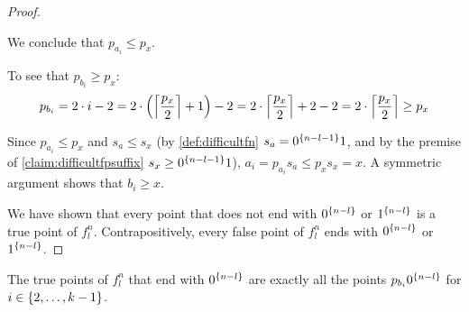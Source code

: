 \begin{proof}
\begin{itemize}
We conclude that $p_{a_i} \leq p_x$.

To see that $p_{b_i} \geq p_x$:
$$
p_{b_i}
= 2 \cdot i - 2
= 2 \cdot \round*{\ceil*{\frac{p_x}{2}} + 1} - 2
= 2 \cdot \ceil*{\frac{p_x}{2}} + 2 - 2
= 2 \cdot \ceil*{\frac{p_x}{2}}
\geq p_x
$$

Since $p_{a_i} \leq p_x$ and $s_a \leq s_x$
(by \cref{def:difficultfn}
$s_a = \rep{0}{n-l-1} 1$,
and by the premise of \cref{claim:difficultfpsuffix}
$s_x \geq \rep{0}{n-l-1} 1$),
$a_i = p_{a_i} s_a \leq p_x s_x = x$.
A symmetric argument shows that $b_i \geq x$.
\end{itemize}

We have shown that every point that does not end with
$\rep{0}{n-l}$ or $\rep{1}{n-l}$
is a true point of $f_l^n$.
Contrapositively,
every false point of $f_l^n$
ends with $\rep{0}{n-l}$ or $\rep{1}{n-l}$.
\end{proof}

\begin{observation}
\label{observation:difficulttpinb}
The true points of $f_l^n$
that end with $\rep{0}{n-l}$
are exactly all the points $p_{b_i} \rep{0}{n-l}$
for $i \in \curly{2, \ldots, k-1}$.
\end{observation}

